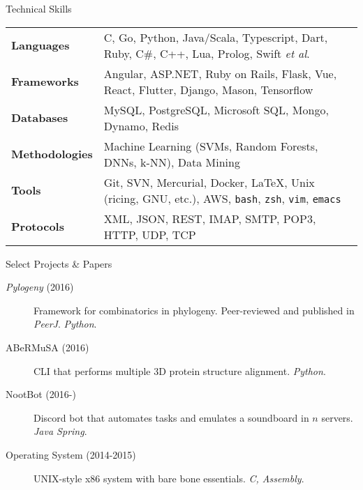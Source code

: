 \documentclass{resume} %
\begin{document}

\begin{rSection}{Technical Skills}

\begin{tabular}{ @{} >{\bfseries}l @{\hspace{1ex}} l }
Languages & C, Go, Python, Java/Scala, Typescript, Dart, Ruby, C\#, C++, Lua, Prolog, Swift \textit{et al}. \\
Frameworks & Angular, ASP.NET, Ruby on Rails, Flask, Vue, React, Flutter, Django, Mason, Tensorflow \\ 
Databases & MySQL, PostgreSQL, Microsoft SQL, Mongo, Dynamo, Redis \\
Methodologies & Machine Learning (SVMs, Random Forests, DNNs, k-NN), Data Mining \\
Tools & Git, SVN, Mercurial, Docker, \LaTeX, Unix (ricing, GNU, etc.), AWS, \texttt{bash}, \texttt{zsh}, \texttt{vim}, \texttt{emacs} \\
Protocols & XML, JSON, REST, IMAP, SMTP, POP3, HTTP, UDP, TCP
\end{tabular}

\end{rSection}


\begin{rSection}{Select Projects \& Papers}

\begin{description}
\item [\textit{Pylogeny} (2016)] Framework for combinatorics in phylogeny. Peer-reviewed and published in \textit{PeerJ}. \textit{Python}.
\item [ABeRMuSA (2016)] CLI that performs multiple 3D protein structure alignment. \textit{Python}.
\item [NootBot (2016-)] Discord bot that automates tasks and emulates a soundboard in $n$ servers. \textit{Java Spring}.
\item [Operating System (2014-2015)] UNIX-style x86 system with bare bone essentials. \textit{C, Assembly}.
\end{description}

\end{rSection}

\end{document}
